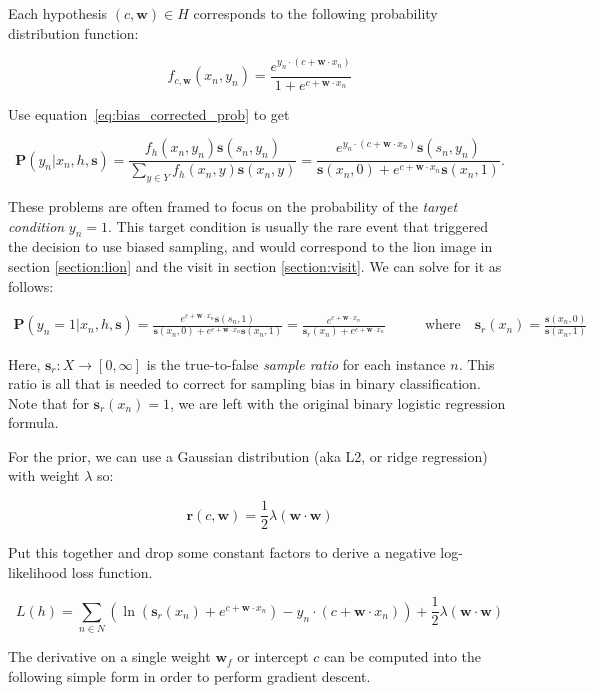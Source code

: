 \documentclass[twoside]{article}
\begin{document}
Each hypothesis \((c, \mathbf{w}) \in H\) corresponds to the following probability distribution function:

\[f_{c,\mathbf{w}}(x_n, y_n)=\frac{e^{y_n \cdot (c+\mathbf{w} \cdot x_n)}}{1+e^{c+\mathbf{w} \cdot x_n}}\]

Use equation~\eqref{eq:bias_corrected_prob} to get

\[\mathbf{P}(y_n|x_n,h,\mathbf{s})=\frac{f_h(x_n,y_n)\mathbf{s}(s_n,y_n)}{\sum_{y \in Y}f_h(x_n,y)\mathbf{s}(x_n,y)}=\frac{e^{y_n \cdot (c+\mathbf{w} \cdot x_n)}\mathbf{s}(s_n,y_n)}{\mathbf{s}(x_n,0)+e^{c+\mathbf{w} \cdot x_n}\mathbf{s}(x_n,1)}.\]

These problems are often framed to focus on the probability of the \textit{target condition} \(y_n = 1\). This target condition is usually the rare event that triggered the decision to use biased sampling, and would correspond to the lion image in section \ref{section:lion} and the visit in section \ref{section:visit}. We can solve for it as follows:

\begin{align}
\mathbf{P}(y_n=1|x_n,h,\mathbf{s})=\frac{e^{c+\mathbf{w} \cdot x_n}\mathbf{s}(s_n,1)}{\mathbf{s}(x_n,0)+e^{c+\mathbf{w} \cdot x_n}\mathbf{s}(x_n,1)}=\frac{e^{c+\mathbf{w} \cdot x_n}}{\mathbf{s}_r(x_n)+e^{c+\mathbf{w} \cdot x_n}} &
\qquad \textrm{where} \quad \mathbf{s}_r(x_n)=\frac{\mathbf{s}(x_n, 0)}{\mathbf{s}(x_n, 1)}
\end{align}

Here, \(\mathbf{s}_r: X \to [0, \infty]\) is the true-to-false \textit{sample ratio} for each instance \(n\). This ratio is all that is needed to correct for sampling bias in binary classification. Note that for \(\mathbf{s}_r(x_n)=1\), we are left with the original binary logistic regression formula.

For the prior, we can use a Gaussian distribution (aka L2, or ridge regression) with weight \(\lambda\) so:

\[\mathbf{r}(c,\mathbf{w})=\frac{1}{2}\lambda(\mathbf{w} \cdot \mathbf{w})\]

Put this together and drop some constant factors to derive a negative log-likelihood loss function.

\[L(h)=\sum_{n \in  N} \left (\ln\left (\mathbf{s}_r(x_n)+e^{c+\mathbf{w} \cdot x_n}\right ) -y_n \cdot (c+\mathbf{w} \cdot x_n) \right )+ \frac{1}{2}\lambda(\mathbf{w} \cdot \mathbf{w})\]

The derivative on a single weight \(\mathbf{w}_f\) or intercept \(c\) can be computed into the following simple form in order to perform gradient descent.
\end{document}
